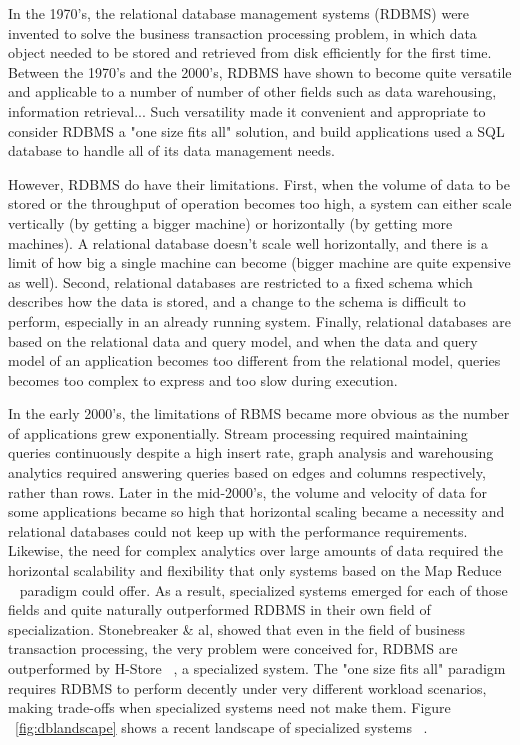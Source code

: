 
In the 1970's, the relational database management systems (RDBMS) were invented to solve the business transaction processing problem, in which data object needed to be stored and retrieved from disk efficiently for the first time. %
Between the 1970's and the 2000's, RDBMS have shown to become quite versatile and applicable to a number of number of other fields such as data warehousing, information retrieval... Such versatility made it convenient and appropriate to consider RDBMS a "one size fits all" solution, and build applications used a SQL database to handle all of its data management needs.

However, RDBMS do have their limitations. First, when the volume of data to be stored or the throughput of operation becomes too high, a system can either scale vertically (by getting a bigger machine) or horizontally (by getting more machines). A relational database doesn't scale well horizontally, and there is a limit of how big a single machine can become (bigger machine are quite expensive as well). Second, relational databases are restricted to a fixed schema which describes how the data is stored, and a change to the schema is difficult to perform, especially in an already running system. Finally, relational databases are based on the relational data and query model, and when the data and query model of an application becomes too different from the relational model, queries becomes too complex to express and too slow during execution.

In the early 2000's, the limitations of RBMS became more obvious as the number of applications grew exponentially. Stream processing required maintaining queries continuously despite a high insert rate, graph analysis and warehousing analytics required answering queries based on edges and columns respectively, rather than rows. Later in the mid-2000's, the volume and velocity of data for some applications became so high that horizontal scaling became a necessity and relational databases could not keep up with the performance requirements.
Likewise, the need for complex analytics over large amounts of data required the horizontal scalability and flexibility that only systems based on the Map Reduce ~\cite{Dean2008} paradigm could offer. As a result, specialized systems emerged for each of those fields and quite naturally outperformed RDBMS in their own field of specialization. Stonebreaker \& al, showed that even in the field of business transaction processing, the very problem were conceived for, RDBMS are outperformed by H-Store ~\cite{Stonebreaker2007}, a specialized system. The "one size fits all" paradigm requires RDBMS to perform decently under very different workload scenarios, making trade-offs when specialized systems need not make them. Figure ~\ref{fig:dblandscape} shows a recent landscape of specialized systems ~\cite{Aslett2012}.

